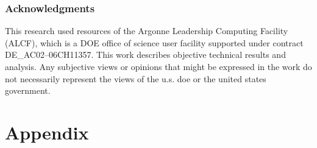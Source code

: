 \documentclass{article} %
\begin{document}
\subsubsection*{Acknowledgments}
This research used resources of the Argonne Leadership Computing Facility (ALCF), which is a DOE office of science user
facility supported under contract DE\_AC02--06CH11357.%
%
This work describes objective technical results and analysis.
%
Any subjective views or opinions that might be expressed in the work do not necessarily represent the views of the u.s.
doe or the united states government.




\appendix
\section{Appendix}
%
\end{document}
